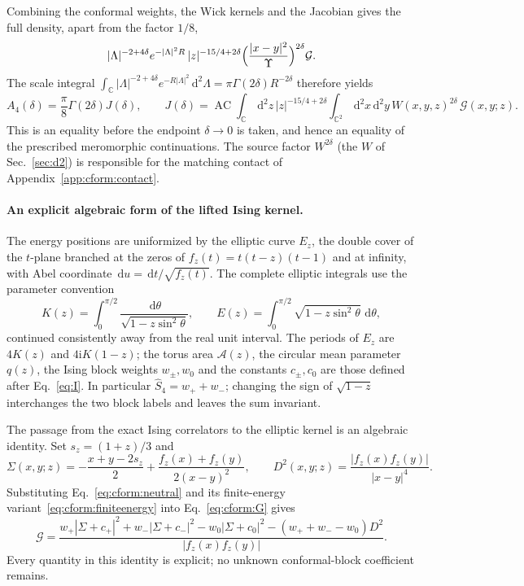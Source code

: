 \documentclass[11pt,a4paper]{article}
\numberwithin{equation}{section}
\newcommand{\dd}{\,\mathrm d}
\newcommand{\AC}{\operatorname{AC}}
\begin{document}
Combining the conformal weights, the Wick kernels and the Jacobian gives the full density, apart from the factor $1/8$,
\begin{equation}
 |\Lambda|^{-2+4\delta}e^{-|\Lambda|^2R}\,|z|^{-15/4+2\delta}\Bigl(\frac{|x-y|^2}{\Upsilon}\Bigr)^{2\delta}\mathcal G.
\end{equation}
The scale integral $\int_{\mathbb C}|\Lambda|^{-2+4\delta}e^{-R|\Lambda|^2}\dd^2\Lambda=\pi\Gamma(2\delta)R^{-2\delta}$
therefore yields
\begin{equation}
 A_4(\delta)=\frac\pi8\Gamma(2\delta)J(\delta),\qquad
 J(\delta)=\AC\!\int_{\mathbb C}\dd^2z\,|z|^{-15/4+2\delta}\int_{\mathbb C^2}\dd^2x\dd^2y\,
 W(x,y,z)^{2\delta}\,\mathcal G(x,y;z).
 \label{eq:cform:J}
\end{equation}
This is an equality before the endpoint $\delta\to0$ is taken, and hence an equality of the prescribed meromorphic
continuations. The source factor $W^{2\delta}$ (the $W$ of Sec.~\ref{sec:d2}) is responsible for the matching contact
of Appendix~\ref{app:cform:contact}.

\paragraph{An explicit algebraic form of the lifted Ising kernel.} The energy positions are uniformized by the
elliptic curve $E_z$, the double cover of the $t$-plane branched at the zeros of $f_z(t)=t(t-z)(t-1)$ and at infinity,
with Abel coordinate $\dd u=\dd t/\sqrt{f_z(t)}$. The complete elliptic integrals use the parameter convention
\begin{equation}
 K(z)=\int_0^{\pi/2}\frac{\dd\theta}{\sqrt{1-z\sin^2\theta}},\qquad
 E(z)=\int_0^{\pi/2}\sqrt{1-z\sin^2\theta}\,\dd\theta,
\end{equation}
continued consistently away from the real unit interval. The periods of $E_z$ are $4K(z)$ and $4\mathrm iK(1-z)$; the
torus area $\mathcal A(z)$, the circular mean parameter $q(z)$, the Ising block weights $w_\pm,w_0$ and the constants
$c_\pm,c_0$ are those defined after Eq.~\eqref{eq:I}. In particular $\widehat S_4=w_++w_-$; changing the sign of
$\sqrt{1-z}$ interchanges the two block labels and leaves the sum invariant.

The passage from the exact Ising correlators to the elliptic kernel is an algebraic identity. Set $s_z=(1+z)/3$ and
\begin{equation}
 \Sigma(x,y;z)=-\frac{x+y-2s_z}{2}+\frac{f_z(x)+f_z(y)}{2(x-y)^2},\qquad
 D^2(x,y;z)=\frac{|f_z(x)f_z(y)|}{|x-y|^4}.
\end{equation}
Substituting Eq.~\eqref{eq:cform:neutral} and its finite-energy variant~\eqref{eq:cform:finiteenergy} into
Eq.~\eqref{eq:cform:G} gives
\begin{equation}
 \mathcal G=\frac{w_+|\Sigma+c_+|^2+w_-|\Sigma+c_-|^2-w_0|\Sigma+c_0|^2-(w_++w_--w_0)D^2}{|f_z(x)f_z(y)|}.
 \label{eq:cform:cover}
\end{equation}
Every quantity in this identity is explicit; no unknown conformal-block coefficient remains.
\end{document}
